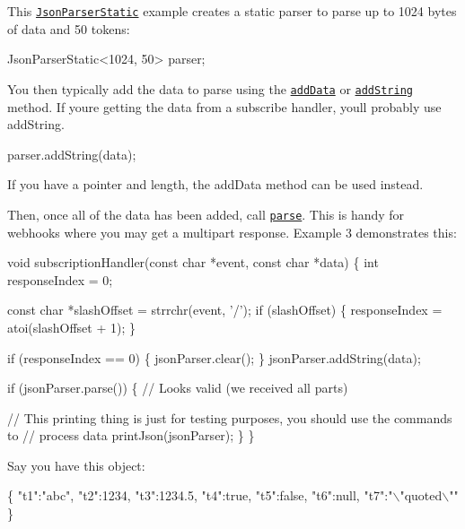 This \href{http://rickkas7.github.io/JsonParserGeneratorRK/class_json_parser_static.html}{\tt Json\+Parser\+Static} example creates a static parser to parse up to 1024 bytes of data and 50 tokens\+:


\begin{DoxyCode}
JsonParserStatic<1024, 50> parser;
\end{DoxyCode}


You then typically add the data to parse using the \href{http://rickkas7.github.io/JsonParserGeneratorRK/class_json_buffer.html#a760cb5be42ed2d2ca9306b1109e76af3}{\tt add\+Data} or \href{http://rickkas7.github.io/JsonParserGeneratorRK/class_json_buffer.html#a61bf30ac6e1bd460f1e809d02a7d5ba4}{\tt add\+String} method. If you\textquotesingle{}re getting the data from a subscribe handler, you\textquotesingle{}ll probably use add\+String.


\begin{DoxyCode}
parser.addString(data);
\end{DoxyCode}


If you have a pointer and length, the add\+Data method can be used instead.

Then, once all of the data has been added, call \href{http://rickkas7.github.io/JsonParserGeneratorRK/class_json_parser.html#ad528213e8600cbad4d85910b62fc033a}{\tt parse}. This is handy for webhooks where you may get a multipart response. Example 3 demonstrates this\+:


\begin{DoxyCode}
void subscriptionHandler(const char *event, const char *data) \{
    int responseIndex = 0;

    const char *slashOffset = strrchr(event, '/');
    if (slashOffset) \{
        responseIndex = atoi(slashOffset + 1);
    \}

    if (responseIndex == 0) \{
        jsonParser.clear();
    \}
    jsonParser.addString(data);

    if (jsonParser.parse()) \{
        // Looks valid (we received all parts)

        // This printing thing is just for testing purposes, you should use the commands to
        // process data
        printJson(jsonParser);
    \}
\}
\end{DoxyCode}


Say you have this object\+:


\begin{DoxyCode}
\{
  "t1":"abc",
  "t2":1234,
  "t3":1234.5,
  "t4":true,
  "t5":false,
  "t6":null,
  "t7":"\(\backslash\)"quoted\(\backslash\)""
\}
\end{DoxyCode}


